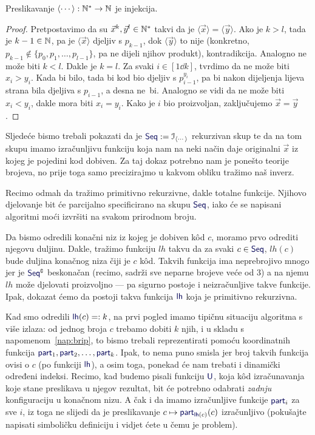 \begin{propozicija}[{name=[injektivnost kodiranja konačnih nizova]}]\label{prop:codeinj}
Preslikavanje $\langle\cdots\rangle:{\mathbb N}^*\to{\mathbb N}$ je injekcija.
\end{propozicija}
\begin{proof}
    Pretpostavimo da su $\vec x^k,\vec y^{l}\in{\mathbb N}^*$ takvi da je $\langle\vec x\rangle=\langle\vec y\rangle$. Ako je $k>l$, tada je $k-1\in{\mathbb N}$, pa je $\langle\vec x\rangle$ djeljiv s $p_{k-1}$, dok $\langle\vec y\rangle$ to nije (konkretno, $p_{k-1}\notin\{p_0,p_1,\dotsc,p_{l-1}\}$, pa ne dijeli njihov produkt), kontradikcija. Analogno ne može biti $k<l$. Dakle je $k=l$. Za svaki $i\in[1\dd k]$, tvrdimo da ne može biti $x_i>y_i$. Kada bi bilo, tada bi kod bio djeljiv s $p_{i-1}^{y_i}$, pa bi nakon dijeljenja lijeva strana bila djeljiva s $p_{i-1}$, a desna ne~bi. Analogno se vidi da ne može biti $x_i<y_i$, dakle mora biti $x_i=y_i$. Kako je $i$ bio proizvoljan, zaključujemo $\vec x=\vec y$.
\end{proof}

Sljedeće bismo trebali pokazati da je $\f{Seq}:=\im{\langle\cdots\rangle}$ rekurzivan skup te da na tom skupu imamo izračunljivu funkciju koja nam na neki način daje originalni $\vec x$ iz kojeg je pojedini kod dobiven. Za taj dokaz potrebno nam je ponešto teorije brojeva, no prije toga samo precizirajmo u kakvom obliku tražimo naš inverz.

Recimo odmah da tražimo primitivno rekurzivne, dakle totalne funkcije. Njihovo djelovanje bit će parcijalno specificirano na skupu $\f{Seq}$, iako će se napisani algoritmi moći izvršiti na svakom prirodnom broju.

Da bismo odredili konačni niz iz kojeg je dobiven k\^od $c$, moramo prvo odrediti njegovu duljinu. Dakle, tražimo funkciju $lh$ takvu da za svaki $c\in\f{Seq}$, $lh(c)$ bude duljina konačnog niza čiji je $c$ k\^od. Takvih funkcija ima neprebrojivo mnogo jer je $\f{Seq}\kompl$ beskonačan (recimo, sadrži sve neparne brojeve veće od $3$) a na njemu $lh$ može djelovati proizvoljno --- pa sigurno postoje i neizračunljive takve funkcije. Ipak, dokazat ćemo da postoji takva funkcija $\f{lh}$ koja je primitivno rekurzivna.

Kad smo odredili $\f{lh}(c)=:k$, na prvi pogled imamo tipičnu situaciju algoritma s više izlaza: od jednog broja $c$ trebamo dobiti $k$ njih, i u skladu s napomenom~\ref{nap:brip}, to bismo trebali reprezentirati pomoću koordinatnih funkcija $\f{part}_1,\f{part}_2,\dotsc,\f{part}_k$. Ipak, to nema puno smisla jer broj takvih funkcija ovisi o $c$ (po funkciji $\f{lh}$), a osim toga, ponekad će nam trebati i dinamički određeni indeksi. Recimo, kad budemo pisali funkciju $\f U$, koja k\^od izračunavanja koje stane preslikava u njegov rezultat, bit će potrebno odabrati \emph{zadnju} konfiguraciju u konačnom nizu. A čak i da imamo izračunljive funkcije $\f{part}_i$ za sve $i$, iz toga ne slijedi da je preslikavanje $c\mapsto\f{part}_{\f{lh}(c)}(c)$ izračunljivo (pokušajte napisati simboličku definiciju i vidjet ćete u čemu je problem).


